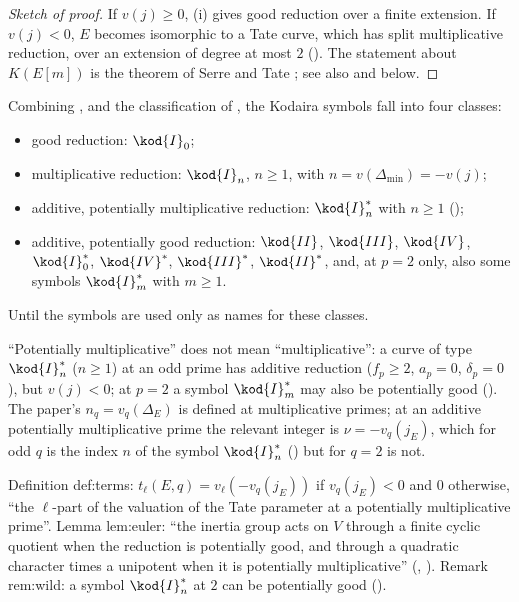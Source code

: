 \begin{proof}[Sketch of proof]
If $v(j)\ge0$, (i) gives good reduction over a finite extension. If
$v(j)<0$, $E$ becomes isomorphic to a Tate curve, which has split multiplicative reduction, over an extension
of degree at most $2$ (). The statement about $K(E[m])$ is the theorem of
Serre and Tate \cite[Section 2]{SerreTate68}; see also \cite[VII.5]{SilvermanAEC} and
 below.
\end{proof}

\begin{remark}\label{rem:reduction:types-of-the-four-cases}
Combining ,  and the classification of
, the Kodaira symbols fall into four classes:
\begin{itemize}
\item good reduction: $\kod{I}_0$;
\item multiplicative reduction: $\kod{I}_n$, $n\ge1$, with $n=v(\Delta_{\min})=-v(j)$;
\item additive, potentially multiplicative reduction: $\kod{I}_n^*$ with $n\ge1$ ();
\item additive, potentially good reduction: $\kod{II}$, $\kod{III}$, $\kod{IV}$, $\kod{I}_0^*$, $\kod{IV}^*$, $\kod{III}^*$, $\kod{II}^*$,
and, at $p=2$ only, also some symbols $\kod{I}_m^*$ with $m\ge1$.
\end{itemize}
Until  the symbols are used only as names for these classes.
\end{remark}

\begin{warning}\label{warn:reduction:potmult}
``Potentially multiplicative'' does not mean ``multiplicative'': a curve of type $\kod{I}_n^*$ ($n\ge1$) at an
odd prime has additive reduction ($f_p\ge2$, $a_p=0$, $\delta_p=0$), but $v(j)<0$; at $p=2$ a symbol $\kod{I}_m^*$ may also be
potentially good (). The paper's $n_q=v_q(\Delta_E)$ is defined at
multiplicative primes; at an additive potentially multiplicative prime the relevant integer is $\nu=-v_q(j_E)$,
which for odd $q$ is the index $n$ of the symbol $\kod{I}_n^*$ () but for
$q=2$ is not.
\end{warning}

\begin{paperlink}
Definition def:terms: $t_\ell(E,q)=v_\ell(-v_q(j_E))$ if $v_q(j_E)<0$ and $0$ otherwise, ``the $\ell$-part of the
valuation of the Tate parameter at a potentially multiplicative prime''. Lemma lem:euler: ``the inertia group acts
on $V$ through a finite cyclic quotient when the reduction is potentially good, and through a quadratic character
times a unipotent when it is potentially multiplicative'' (,
). Remark rem:wild: a symbol $\kod{I}_n^*$ at $2$ can be potentially good
().
\end{paperlink}

